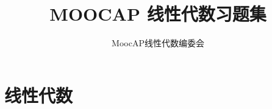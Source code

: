 \documentclass[a4paper]{book}
\newcommand{\sanhao}{\fontsize{12.75pt}{\baselineskip}\selectfont}
\begin{document}
\title{\Huge \bf MOOCAP 线性代数习题集} \normalfont
\date{}
\author{MoocAP线性代数编委会}
\maketitle
\tableofcontents

\noindent


\part{线性代数}












\end{document}
